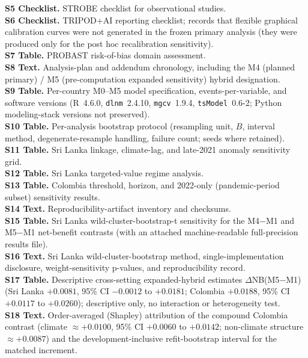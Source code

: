 \documentclass[11pt,a4paper]{article}
\begin{document}
\textbf{S5 Checklist.} STROBE checklist for observational studies.\\
\textbf{S6 Checklist.} TRIPOD+AI reporting checklist; records that flexible graphical calibration curves were not generated in the frozen primary analysis (they were produced only for the post hoc recalibration sensitivity).\\
\textbf{S7 Table.} PROBAST risk-of-bias domain assessment.\\
\textbf{S8 Text.} Analysis-plan and addendum chronology, including the M4 (planned primary) / M5 (pre-computation expanded sensitivity) hybrid designation.\\
\textbf{S9 Table.} Per-country M0--M5 model specification, events-per-variable, and software versions (R~4.6.0, \texttt{dlnm}~2.4.10, \texttt{mgcv}~1.9.4, \texttt{tsModel}~0.6-2; Python modeling-stack versions not preserved).\\
\textbf{S10 Table.} Per-analysis bootstrap protocol (resampling unit, $B$, interval method, degenerate-resample handling, failure count; seeds where retained).\\
\textbf{S11 Table.} Sri Lanka linkage, climate-lag, and late-2021 anomaly sensitivity grid.\\
\textbf{S12 Table.} Sri Lanka targeted-value regime analysis.\\
\textbf{S13 Table.} Colombia threshold, horizon, and 2022-only (pandemic-period subset) sensitivity results.\\
\textbf{S14 Text.} Reproducibility-artifact inventory and checksums.\\
\textbf{S15 Table.} Sri Lanka wild-cluster-bootstrap-t sensitivity for the M4$-$M1 and M5$-$M1 net-benefit contrasts (with an attached machine-readable full-precision results file).\\
\textbf{S16 Text.} Sri Lanka wild-cluster-bootstrap method, single-implementation disclosure, weight-sensitivity p-values, and reproducibility record.\\
\textbf{S17 Table.} Descriptive cross-setting expanded-hybrid estimates $\Delta$NB(M5$-$M1) (Sri Lanka $+0.0081$, 95\% CI $-0.0012$ to $+0.0181$; Colombia $+0.0188$, 95\% CI $+0.0117$ to $+0.0260$); descriptive only, no interaction or heterogeneity test.\\
\textbf{S18 Text.} Order-averaged (Shapley) attribution of the compound Colombia contrast (climate $\approx+0.0100$, 95\% CI $+0.0060$ to $+0.0142$; non-climate structure $\approx+0.0087$) and the development-inclusive refit-bootstrap interval for the matched increment.
\endgroup
\end{document}
